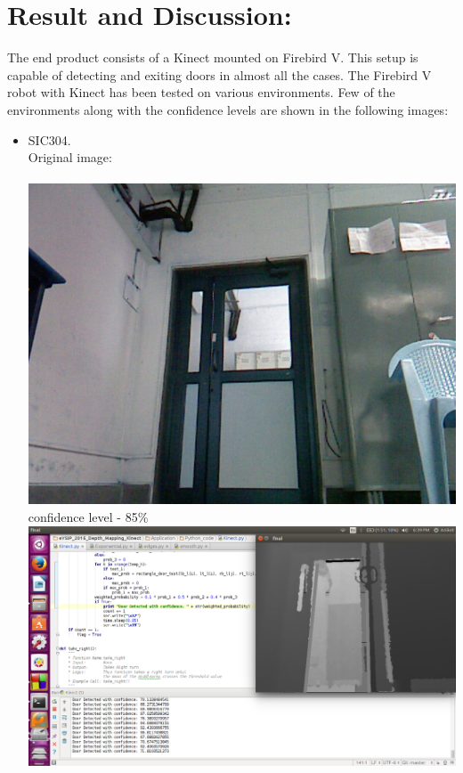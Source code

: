 \documentclass{report}
\begin{document}
\pagebreak

\chapter{Result and Discussion:} 
The end product consists of a Kinect mounted on Firebird V. This setup is capable of detecting and exiting doors in
almost all the cases.
The Firebird V robot with Kinect has been tested on various environments. Few of the 
environments along with the confidence levels are shown in the following images:
\pagebreak

\begin{itemize}
 \item SIC304.\\
 Original image: \\ \\
 \includegraphics[width = 14cm]{reference.jpg} \\
 confidence level - 85\% \\
 \includegraphics[width = 14cm]{confidence_304.png} \\
 

\end{itemize}
\end{document}
